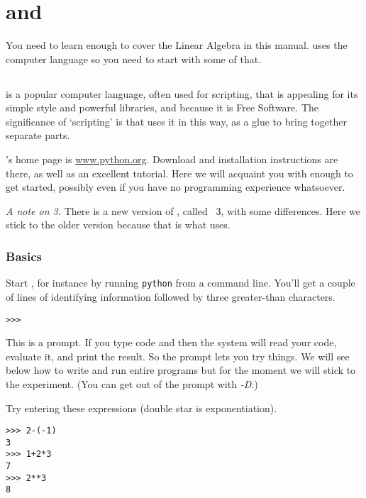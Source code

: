 \chapter{\python{} and \Sage{}}

You need to learn enough \Sage{} to cover the Linear Algebra
in this manual.
\Sage{} uses the computer language \python{} so you need to start with 
some of that.




\section{\python}
\python{} is a popular computer language, often used for scripting,
that is appealing for its simple style and powerful libraries,
and because it is Free Software.
The significance of `scripting' is that \Sage{} uses it in this way,
as a glue to bring together separate parts.

\python's home page is \href{http://www.python.org}{\url{www.python.org}}.
Download and installation instructions are there, as well as 
an excellent tutorial.
Here we will acquaint you with enough \python{} to get started, possibly
even if you have no programming experience whatsoever.

\smallskip
\textit{A note on \python{} 3.}
There is a new version of \python{}, called \python~3, with some differences.
Here we stick to the older version 
because that is what \Sage{} uses.


\subsection{Basics}
Start \python, for instance by running 
\lstinline[style=inline]!python!
from a command line.
You'll get a couple of lines of 
identifying information followed by three greater-than
characters.
\begin{lstlisting}[style=python]
>>>   
\end{lstlisting}
This is a prompt.
If you type \python{} code and  then the system
will read your code, evaluate it, and print the result.
So the prompt lets you try things.
We will see below how to write and run entire \python{} programs
but for the moment we will stick to the experiment. 
(You can get out of the prompt with \textit{-D}.)

Try entering these expressions (double star is exponentiation).
\begin{lstlisting}[style=python]
>>> 2-(-1)
3
>>> 1+2*3
7
>>> 2**3
8  
\end{lstlisting}

